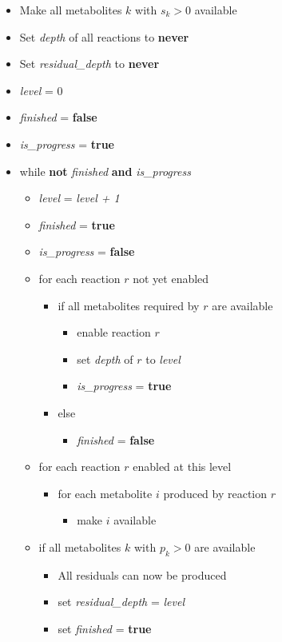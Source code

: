 \documentclass[12pt,twoside,fleqn,a4paper]{article}
\begin{document}
\begin{itemize}
\item Make all metabolites $k$ with $s_k > 0$ available
\item Set \emph{depth} of all reactions to {\bf never}
\item Set \emph{residual\_depth} to {\bf never}
\item \emph{level} = 0
\item \emph{finished} = {\bf false}
\item \emph{is\_progress } = {\bf true}
\item while {\bf not} \emph{finished} {\bf and} \emph{is\_progress}
  \begin{itemize}
  \item \emph{level} = \emph{level + 1}
  \item \emph{finished} = {\bf true}
  \item \emph{is\_progress} = {\bf false}
  \item for each reaction $r$ not yet enabled
    \begin{itemize}
    \item if all metabolites required by $r$ are available
      \begin{itemize}
      \item enable reaction $r$
      \item set \emph{depth} of $r$ to \emph{level}
      \item \emph{is\_progress} = {\bf true}
      \end{itemize}
    \item else
      \begin{itemize}
      \item \emph{finished} = {\bf false}
      \end{itemize}
    \end{itemize}
  \item for each reaction $r$ enabled at this level
    \begin{itemize}
    \item for each metabolite $i$ produced by reaction $r$
      \begin{itemize}
      \item make $i$ available
      \end{itemize}
    \end{itemize}
  \item if all metabolites $k$ with $p_k > 0$ are available
    \begin{itemize}
    \item All residuals can now be produced
    \item set \emph{residual\_depth} = \emph{level}
    \item set \emph{finished} = {\bf true}
    \end{itemize}
  \end{itemize}
\end{itemize}
\end{document}

